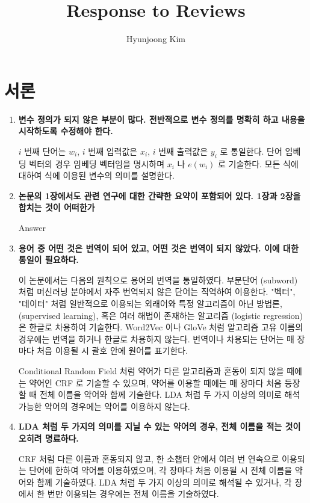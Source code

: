 \documentclass[11pt]{article}
\begin{document}
\title{Response to Reviews}
\author{Hyunjoong Kim}
\maketitle
\smallskip

\section{서론}
\begin{enumerate}
\item \textbf{변수 정의가 되지 않은 부분이 많다. 전반적으로 변수 정의를 명확히 하고 내용을 시작하도록 수정해야 한다.}

$i$ 번째 단어는 $w_i$, $i$ 번째 입력값은 $x_i$, $i$ 번째 출력값은 $y_i$ 로 통일한다. 단어 임베딩 벡터의 경우 임베딩 벡터임을 명시하며 $x_i$ 나 $e(w_i)$ 로 기술한다. 모든 식에 대하여 식에 이용된 변수의 의미를 설명한다.

\item \textbf{논문의 1장에서도 관련 연구에 대한 간략한 요약이 포함되어 있다. 1장과 2장을 합치는 것이 어떠한가}

Answer


\item \textbf{용어 중 어떤 것은 번역이 되어 있고, 어떤 것은 번역이 되지 않았다. 이에 대한 통일이 필요하다.}

이 논문에서는 다음의 원칙으로 용어의 번역을 통일하였다. 부분단어 (subword) 처럼 머신러닝 분야에서 자주 번역되지 않은 단어는 직역하여 이용한다. "벡터", "데이터" 처럼 일반적으로 이용되는 외래어와 특정 알고리즘이 아닌 방법론, (supervised learning), 혹은 여러 해법이 존재하는 알고리즘 (logistic regression) 은 한글로 차용하여 기술한다. Word2Vec 이나 GloVe 처럼 알고리즘 고유 이름의 경우에는 번역을 하거나 한글로 차용하지 않는다. 번역이나 차용되는 단어는 매 장마다 처음 이용될 시 괄호 안에 원어를 표기한다. 

Conditional Random Field 처럼 약어가 다른 알고리즘과 혼동이 되지 않을 때에는 약어인 CRF 로 기술할 수 있으며, 약어를 이용할 때에는 매 장마다 처음 등장할 때 전체 이름을 약어와 함께 기술한다. LDA 처럼 두 가지 이상의 의미로 해석 가능한 약어의 경우에는 약어를 이용하지 않는다.

\item \textbf{LDA 처럼 두 가지의 의미를 지닐 수 있는 약어의 경우, 전체 이름을 적는 것이 오히려 명료하다.}

CRF 처럼 다른 이름과 혼동되지 않고, 한 소챕터 안에서 여러 번 연속으로 이용되는 단어에 한하여 약어를 이용하였으며, 각 장마다 처음 이용될 시 전체 이름을 약어와 함께 기술하였다. LDA 처럼 두 가지 이상의 의미로 해석될 수 있거나, 각 장에서 한 번만 이용되는 경우에는 전체 이름을 기술하였다.


\end{enumerate}
\end{document}
